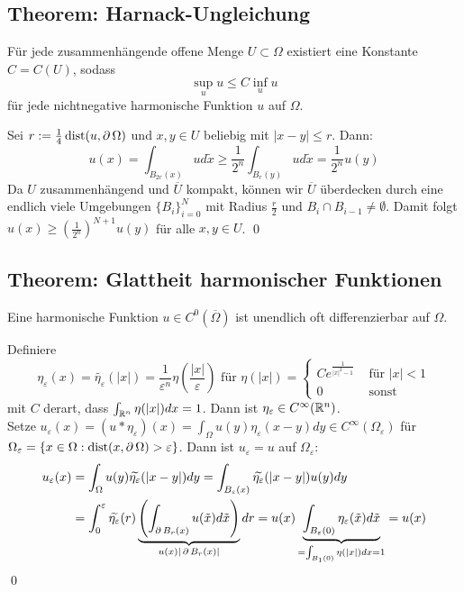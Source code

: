\subsection{Theorem: Harnack-Ungleichung}
\label{thm:harnack-ungl} \label{thm_41}
	Für jede zusammenhängende offene Menge $U \subset \Omega$ existiert eine Konstante $C = C(U)$, sodass \marginnote{[41]}
	\[ \sup_u u \leq C \inf_u u \]
	für jede nichtnegative harmonische Funktion $u$ auf $\Omega$.
	
	Sei $r := \frac{1}{4} \operatorname{dist}(u,\operatorname{\partial} \Omega)$ und $x,y \in U$ beliebig mit $|x-y| \leq r$. Dann:
	\[ u(x) = \int_{B_{2r}(x)} ud \tilde{x} \geq \frac{1}{2^n} \int_{B_r(y)} ud\tilde{x} = \frac{1}{2^n} u(y)\]
	Da $U$ zusammenhängend und $\overline{U}$ kompakt, können wir $\overline{U}$ überdecken durch eine endlich viele Umgebungen $\{B_i\}_{i = 0}^N$ mit Radius $\frac{r}{2}$ und $B_i \cap B_{i-1} \neq \emptyset$. Damit folgt $u(x) \geq \left( \frac{1}{2^n} \right)^{N+1} u(y)$ für alle $x,y \in U$. \qed
	
\subsection{Theorem: Glattheit harmonischer Funktionen}
\label{thm:glattheit_harm_fkt} \label{thm_42}
	Eine harmonische Funktion $u \in C^0(\overline{\Omega})$ ist unendlich oft differenzierbar auf $\Omega$. \marginnote{[42]}
	
	Definiere 
	\[\eta_\varepsilon(x) = \widetilde{\eta_\varepsilon}(|x|) = \frac{1}{\varepsilon^n} \eta \left( \frac{|x|}{\varepsilon} \right) \text{ für } \eta(|x|)= \begin{cases}
		Ce^{\frac{1}{|x|^2-1}} & \text{ für } |x| < 1 \\
		0 & \text{ sonst} \end{cases} \]
	mit $C$ derart, dass $\int_{\mathbb{R}^n} \eta(|x|) dx = 1$. Dann ist $\eta_\varepsilon \in C^\infty(\mathbb{R}^n)$. \\
	Setze $u_\varepsilon(x) = (u * \eta_\varepsilon)(x) = \int_\Omega u(y) \eta_\varepsilon(x-y) dy \in C^\infty(\Omega_\varepsilon)$ für $\Omega_\varepsilon = \{x \in \Omega : \operatorname{dist}(x,\operatorname{\partial} \Omega) > \varepsilon\}$. Dann ist $u_\varepsilon = u$ auf $\Omega_\varepsilon$:
	\begin{equation}
	\begin{aligned}
		u_\varepsilon(x) &= \int_{\Omega} u(y) \widetilde{\eta_\varepsilon}(|x-y|)dy = \int_{B_\varepsilon(x)} \widetilde{\eta_\varepsilon} (|x-y|)u(y) dy \\ \notag
		&= \int_0^\varepsilon \widetilde{\eta_\varepsilon}(r) \underbrace{\left( \int_{\operatorname{\partial} B_r(x)} u(\tilde{x}) d \tilde{x} \right)}_{u(x) |\operatorname{\partial} B_r(x)|} dr = u(x) \underbrace{\int_{B_\varepsilon(0)} \eta_\varepsilon(\tilde{x}) d\tilde{x}}_{= \int_{B_1(0)} \eta(|x|) dx = 1} = u(x) 
	\end{aligned}
	\end{equation}
	\qed
	
